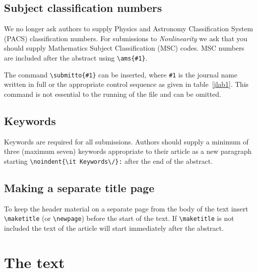 \documentclass[12pt]{iopart}
\begin{document}
\subsection{Subject classification numbers}
We no longer ask authors to supply Physics and Astronomy Classification System (PACS)
classification numbers.  For submissions to {\it Nonlinearity}\/ we ask that you should
supply Mathematics Subject Classification (MSC) codes.  MSC numbers are included after the abstract 
using \verb"\ams{#1}".

The command
\verb"\submitto{#1}" can be inserted, where \verb"#1" is the journal name written in full or the appropriate control sequence as
given in table~\ref{jlab1}. This command is not essential to the running of the file and can be omitted.

\subsection{Keywords}
Keywords are required for all submissions. Authors should supply a minimum of three (maximum seven) keywords appropriate to their article as a new paragraph starting \verb"\noindent{\it Keywords\/}:" after the end of the abstract.

\subsection{Making a separate title page}
To keep the header material on a separate page from the
body of the text insert \verb"\maketitle" (or \verb"\newpage") before the start of the text. 
If \verb"\maketitle" is not included the text of the
article will start immediately after the abstract.  

\section{The text}
\end{document}

